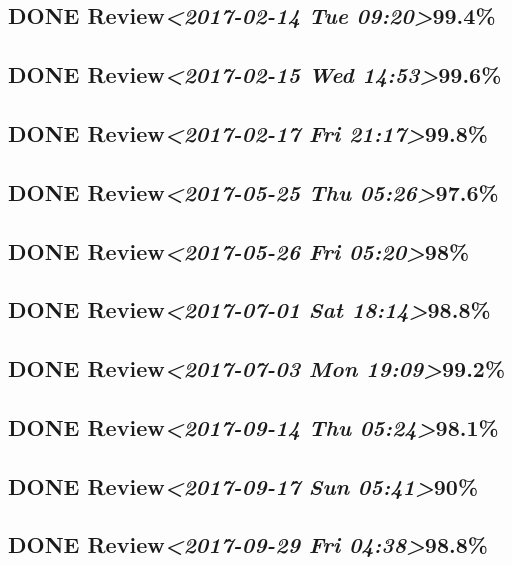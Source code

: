 \documentclass[11pt]{ctexart}
\begin{document}
\subsection{{\bfseries\sffamily DONE} Review\textit{<2017-02-14 Tue 09:20>}99.4\%}
\label{sec:org4302986}
\subsection{{\bfseries\sffamily DONE} Review\textit{<2017-02-15 Wed 14:53>}99.6\%}
\label{sec:org287d869}
\subsection{{\bfseries\sffamily DONE} Review\textit{<2017-02-17 Fri 21:17>}99.8\%}
\label{sec:org1214f6f}
\subsection{{\bfseries\sffamily DONE} Review\textit{<2017-05-25 Thu 05:26>}97.6\%}
\label{sec:org9006aa0}
\subsection{{\bfseries\sffamily DONE} Review\textit{<2017-05-26 Fri 05:20>}98\%}
\label{sec:orgd1429fd}
\subsection{{\bfseries\sffamily DONE} Review\textit{<2017-07-01 Sat 18:14>}98.8\%}
\label{sec:org3a80223}
\subsection{{\bfseries\sffamily DONE} Review\textit{<2017-07-03 Mon 19:09>}99.2\%}
\label{sec:org08d06e2}
\subsection{{\bfseries\sffamily DONE} Review\textit{<2017-09-14 Thu 05:24>}98.1\%}
\label{sec:org821f9ac}
\subsection{{\bfseries\sffamily DONE} Review\textit{<2017-09-17 Sun 05:41>}90\%}
\label{sec:org7f49cf0}
\subsection{{\bfseries\sffamily DONE} Review\textit{<2017-09-29 Fri 04:38>}98.8\%}
\label{sec:orge3d54a6}
\end{document}
